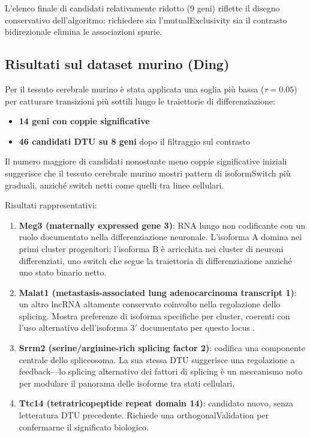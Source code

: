 L'elenco finale di candidati relativamente ridotto (9 geni) riflette il disegno conservativo dell'algoritmo: richiedere sia l'\gls{mutualExclusivity} sia il contrasto bidirezionale elimina le associazioni spurie.

\subsection*{Risultati sul dataset murino (Ding)}\label{sec:results-mouse}

Per il tessuto cerebrale murino è stata applicata una soglia più bassa ($\tau = 0.05$) per catturare transizioni più sottili lungo le traiettorie di differenziazione:
\begin{itemize}
    \item \textbf{14 geni con coppie significative}
    \item \textbf{46 candidati DTU su 8 geni} dopo il filtraggio sul contrasto
\end{itemize}

Il numero maggiore di candidati nonostante meno coppie significative iniziali suggerisce che il tessuto cerebrale murino mostri pattern di \gls{isoformSwitch} più graduali, anziché switch netti come quelli tra linee cellulari.

Risultati rappresentativi:
\begin{enumerate}
    \item \textbf{Meg3 (maternally expressed gene 3)}: RNA lungo non codificante con un ruolo documentato nella differenziazione neuronale. L'isoforma A domina nei primi cluster progenitori; l'isoforma B è arricchita nei cluster di neuroni differenziati, uno switch che segue la traiettoria di differenziazione anziché uno stato binario netto.
    
    \item \textbf{Malat1 (metastasis-associated lung adenocarcinoma transcript 1)}: un altro lncRNA altamente conservato coinvolto nella regolazione dello splicing. Mostra preferenze di isoforma specifiche per cluster, coerenti con l'uso alternativo dell'isoforma 3$'$ documentato per questo locus \cite{ghanam2023malat1}.

    \item \textbf{Srrm2 (serine/arginine-rich splicing factor 2)}: codifica una componente centrale dello spliceosoma. La sua stessa DTU suggerisce una regolazione a feedback---lo splicing alternativo dei fattori di splicing è un meccanismo noto per modulare il panorama delle isoforme tra stati cellulari.

    \item \textbf{Ttc14 (tetratricopeptide repeat domain 14)}: candidato nuovo, senza letteratura DTU precedente. Richiede una \gls{orthogonalValidation} per confermarne il significato biologico.
\end{enumerate}

